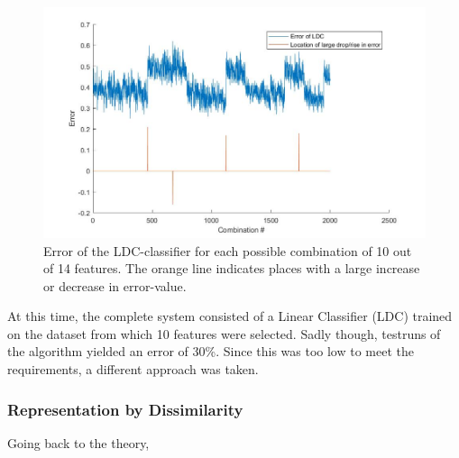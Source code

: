 \begin{figure}[H]
	\centering
	\includegraphics[scale=0.45]{images/feat_jumps.jpg}
	\caption{Error of the LDC-classifier for each possible combination of 10 out of 14 features. The orange line indicates places with a large increase or decrease in error-value.}
	\label{fig:feat_jumps}
\end{figure}
\noindent At this time, the complete system consisted of a Linear Classifier (LDC) trained on the dataset from which 10 features were selected. Sadly though, testruns of the algorithm yielded an error of 30\%. Since this was too low to meet the requirements, a different approach was taken. \\
\subsubsection*{Representation by Dissimilarity}
Going back to the theory, 